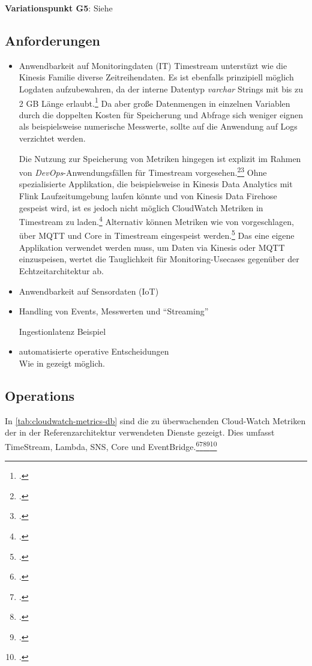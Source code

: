 \textbf{Variationspunkt G5}: Siehe 

\subsection{Anforderungen}
\begin{itemize}
\item Anwendbarkeit auf Monitoringdaten (IT)
Timestream unterstüzt wie die Kinesis Familie diverse Zeitreihendaten. Es ist ebenfalls prinzipiell möglich Logdaten aufzubewahren, da der interne Datentyp \textit{varchar} Strings mit bis zu 2 GB Länge erlaubt.\footcite[Vgl.][]{AmazonWebServicesInc..o.J.br} Da aber große Datenmengen in einzelnen Variablen durch die doppelten Kosten für Speicherung und Abfrage sich weniger eignen als beispielsweise numerische Messwerte, sollte auf die Anwendung auf Logs verzichtet werden.

Die Nutzung zur Speicherung von Metriken hingegen ist explizit im Rahmen von \textit{DevOps}-Anwendungsfällen für Timestream vorgesehen.\footcite[Vgl.][]{AmazonWebServicesInc..o.J.ak}\nzitat\footcite[Vgl.][]{Das.2020} Ohne spezialisierte Applikation, die beispielsweise in Kinesis Data Analytics mit Flink Laufzeitumgebung laufen könnte und von Kinesis Data Firehose gespeist wird, ist es jedoch nicht möglich CloudWatch Metriken in Timestream zu laden.\footcite[Vgl.][]{Riddle.2021} Alternativ können Metriken wie von \citeauthor{Pochiraju.2020} vorgeschlagen, über \ac{MQTT} und \AWSIOT{} Core in Timestream eingespeist werden.\footcite[Vgl.][]{Pochiraju.2020} Das eine eigene Applikation verwendet werden muss, um Daten via Kinesis oder \ac{MQTT} einzuspeisen, wertet die Tauglichkeit für Monitoring-Usecases gegenüber der Echtzeitarchitektur ab.


\item Anwendbarkeit auf Sensordaten (\ac{IoT})

\item Handling von Events, Messwerten und \enquote{Streaming}

Ingestionlatenz Beispiel

\item automatisierte operative Entscheidungen\\
Wie in  gezeigt möglich.
\end{itemize}

\subsection{Operations}
In \autoref{tab:cloudwatch-metrics-db} sind die zu überwachenden Cloud-Watch Metriken der in der Referenzarchitektur verwendeten Dienste gezeigt. Dies umfasst TimeStream, Lambda, \ac{SNS}, \AWSIOT{} Core und EventBridge.\footcite[Vgl.][]{AmazonWebServicesInc..o.J.be}\nzitat\footcite[Vgl.][]{AmazonWebServicesInc..o.J.bf}\nzitat\footcite[Vgl.][]{AmazonWebServicesInc..o.J.bc}\nzitat\footcite[Vgl.][]{AmazonWebServicesInc..o.J.az}\nzitat\footcite[Vgl.][]{AmazonWebServicesInc..o.J.bl}


